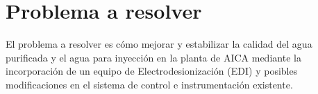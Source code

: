\section{Problema a resolver}
El problema a resolver es cómo mejorar y estabilizar la calidad del agua purificada y el agua para inyección en la planta de AICA mediante la incorporación de un equipo de Electrodesionización (EDI) y posibles modificaciones en el sistema de control e instrumentación existente.\\